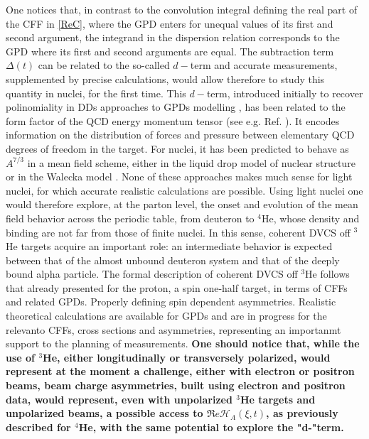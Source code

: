 \documentclass[times, twoside]{PosWhiPap}
\begin{document}
One notices that, in contrast to the convolution integral defining the real 
part of the CFF in \eqref{ReC}, where the GPD enters for unequal values of its 
first and second argument, the integrand in the dispersion relation
corresponds to the GPD where its first and second arguments are equal.
The subtraction term $\Delta(t)$ can be related to the so-called $d-$term and
accurate measurements, supplemented by precise calculations, would allow therefore to study
this quantity in nuclei, for the first time.
This $d-$term, introduced initially to recover 
polinomiality in DDs approaches to GPDs modelling \cite{Polyakov:1999gs},
has been related to the form factor of the QCD energy momentum tensor (see e.g. Ref.  
\cite{Polyakov:2018zvc}). It encodes information on the distribution of forces 
and pressure between elementary QCD degrees of freedom in the target. For
nuclei, it has been predicted to behave as $A^{7/3}$ in a mean field scheme, 
either in the liquid drop model of nuclear structure \cite{Polyakov:2002yz}
or in the Walecka model \cite{Jung:2014jja}. None of these approaches makes 
much sense for light nuclei, for which accurate realistic calculations are possible. 
Using light nuclei one would therefore explore, at the parton 
level, the onset and evolution of the mean field behavior across the
periodic 
table, from deuteron to $^4$He, whose density and binding are not far
from those of finite nuclei.
\vskip 0.2cm
In this sense, coherent DVCS off $^3$He targets acquire an important role: an intermediate 
behavior is expected between that of the almost unbound deuteron system and 
that of the deeply bound alpha particle. The formal description of coherent DVCS
off $^3$He follows that already presented for the proton, a spin one-half target, in terms of CFFs
and related GPDs. Properly
defining spin dependent asymmetries. Realistic theoretical calculations
are available for GPDs 
\cite{Scopetta:2004kj,Scopetta:2009sn,Rinaldi:2012ft,Rinaldi:2012pj} and are in 
progress for the relevanto CFFs, cross sections and asymmetries, representing
an importanmt support to the planning of measurements.
{\bf One should notice that, while the use of $^3$He, either longitudinally or transversely polarized,
would represent at the moment a challenge, either with electron or positron beams, 
beam charge asymmetries, built using
electron and positron data, would represent, even with unpolarized $^3$He targets and unpolarized beams, a possible access to
$\Re e \mathcal{H}_{A} (\xi,t)$,
as previously described for $^4$He, with the same potential to explore the "d-"term.}
\end{document}
